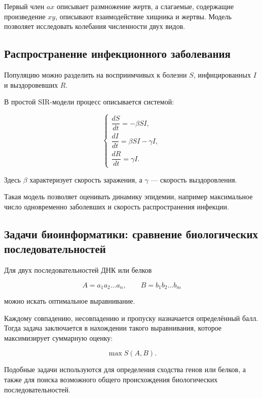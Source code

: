 Первый член $ax$ описывает размножение жертв, а слагаемые, содержащие произведение $xy$, описывают взаимодействие хищника и жертвы. Модель позволяет исследовать колебания численности двух видов.

\subsection{Распространение инфекционного заболевания}

Популяцию можно разделить на восприимчивых к болезни $S$, инфицированных $I$ и выздоровевших $R$.

В простой SIR-модели процесс описывается системой:

\[
\begin{cases}
	\dfrac{dS}{dt}=-\beta SI,\\[6pt]
	\dfrac{dI}{dt}=\beta SI-\gamma I,\\[6pt]
	\dfrac{dR}{dt}=\gamma I.
\end{cases}
\]

Здесь $\beta$ характеризует скорость заражения, а $\gamma$ --- скорость выздоровления.

Такая модель позволяет оценивать динамику эпидемии, например максимальное число одновременно заболевших и скорость распространения инфекции.

\subsection{Задачи биоинформатики: сравнение биологических последовательностей}

Для двух последовательностей ДНК или белков

\[
A=a_1a_2\dots a_n,
\qquad
B=b_1b_2\dots b_m
\]

можно искать оптимальное выравнивание.

Каждому совпадению, несовпадению и пропуску назначается определённый балл. Тогда задача заключается в нахождении такого выравнивания, которое максимизирует суммарную оценку:

\[
\max S(A,B).
\]

Подобные задачи используются для определения сходства генов или белков, а также для поиска возможного общего происхождения биологических последовательностей.


\newpage